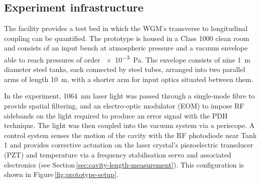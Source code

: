 %
%

\subsection{Experiment infrastructure}
\label{sec:glasgow10m}

The \GLASGOWTENM{} facility provides a test bed in which the \gls{WGM}'s transverse to longitudinal coupling can be quantified. The prototype is housed in a Class 1000 clean room and consists of an input bench at atmospheric pressure and a vacuum envelope able to reach pressures of order \SI{e-3}{\pascal}. The envelope consists of nine \SI{1}{\meter} diameter steel tanks, each connected by steel tubes, arranged into two parallel arms of length \SI{10}{\meter}, with a shorter arm for input optics situated between them.

In the experiment, \SI{1064}{\nano\meter} laser light was passed through a single-mode fibre to provide spatial filtering, and an electro-optic modulator (\gls{EOM}) to impose \gls{RF} sidebands on the light required to produce an error signal with the \gls{PDH} technique. The light was then coupled into the vacuum system via a periscope. A control system senses the motion of the cavity with the \gls{RF} photodiode near Tank 1 and provides corrective actuation on the laser crystal's piezoelectric transducer (\gls{PZT}) and temperature via a frequency stabilisation servo and associated electronics (see Section\,\ref{sec:cavity-length-measurement}). This configuration is shown in Figure\,\ref{fig:prototype-setup}.


